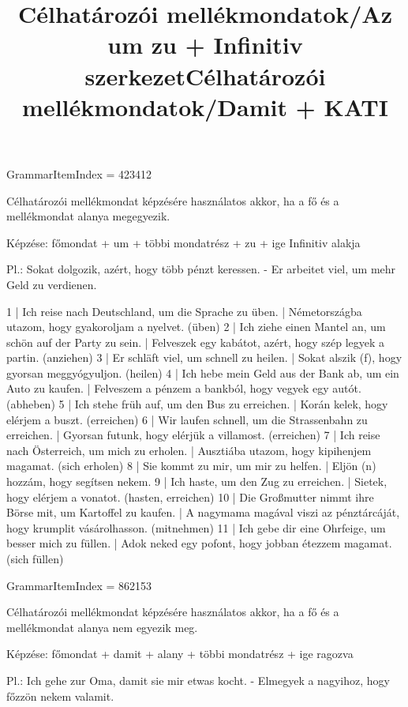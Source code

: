 \title{Célhatározói mellékmondatok/Az um zu + Infinitiv szerkezet}

GrammarItemIndex = 423412

\begin{desc}
Célhatározói mellékmondat képzésére használatos akkor, ha a fő és a mellékmondat alanya megegyezik.

Képzése:
főmondat + um + többi mondatrész + zu + ige Infinitiv alakja

Pl.: Sokat dolgozik, azért, hogy több pénzt keressen. - Er arbeitet viel, um mehr Geld zu verdienen.
\end{desc}

\begin{exmp}
1 | Ich reise nach Deutschland, um die Sprache zu üben. | Németországba utazom, hogy gyakoroljam a nyelvet. (üben)
2 | Ich ziehe einen Mantel an, um schön auf der Party zu sein. | Felveszek egy kabátot, azért, hogy szép legyek a partin. (anziehen)
3 | Er schläft viel, um schnell zu heilen. | Sokat alszik (f), hogy gyorsan meggyógyuljon. (heilen)
4 | Ich hebe mein Geld aus der Bank ab, um ein Auto zu kaufen. | Felveszem a pénzem a bankból, hogy vegyek egy autót. (abheben)
5 | Ich stehe früh auf, um den Bus zu erreichen. | Korán kelek, hogy elérjem a buszt. (erreichen)
6 | Wir laufen schnell, um die Strassenbahn zu erreichen. | Gyorsan futunk, hogy elérjük a villamost. (erreichen)
7 | Ich reise nach Österreich, um mich zu erholen. | Ausztiába utazom, hogy kipihenjem magamat. (sich erholen)
8 | Sie kommt zu mir, um mir zu helfen. | Eljön (n) hozzám, hogy segítsen nekem.
9 | Ich haste, um den Zug zu erreichen. | Sietek, hogy elérjem a vonatot. (hasten, erreichen)
10 | Die Großmutter nimmt ihre Börse mit, um Kartoffel zu kaufen. | A nagymama magával viszi az pénztárcáját, hogy krumplit vásárolhasson. (mitnehmen)
11 | Ich gebe dir eine Ohrfeige, um besser mich zu füllen. | Adok neked egy pofont, hogy jobban étezzem magamat. (sich füllen)
\end{exmp}

\title{Célhatározói mellékmondatok/Damit + KATI}

GrammarItemIndex = 862153

\begin{desc}
Célhatározói mellékmondat képzésére használatos akkor, ha a fő és a mellékmondat alanya nem egyezik meg.

Képzése:
főmondat + damit + alany + többi mondatrész + ige ragozva

Pl.: Ich gehe zur Oma, damit sie mir etwas kocht. - Elmegyek a nagyihoz, hogy főzzön nekem valamit.
\end{desc}

